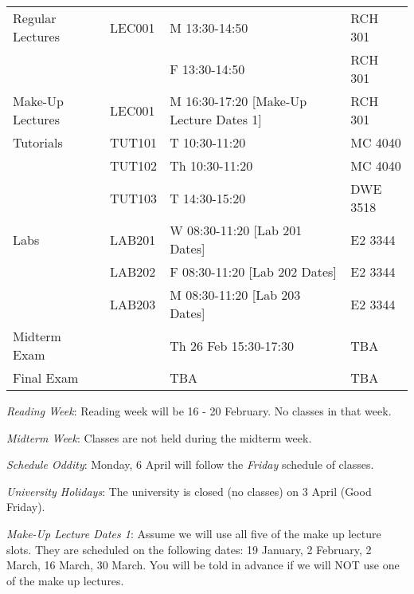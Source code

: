\documentclass[letterpaper,10pt]{article}
\begin{document}
\begin{table}[h]
        \begin{center}
        \begin{tabular}{l|l|l|l}


                 Regular Lectures & LEC001 & M 13:30-14:50 & RCH 301         \\
                                  &        & F 13:30-14:50 & RCH 301         \\
             \hline
                 Make-Up Lectures & LEC001 & M 16:30-17:20 [Make-Up Lecture Dates 1] & RCH 301         \\
                 \hline
                 Tutorials        & TUT101 & T   10:30-11:20 & MC 4040         \\
                                  & TUT102 & Th	 10:30-11:20 & MC 4040         \\
                                  & TUT103 & T   14:30-15:20 & DWE 3518        \\
                 \hline
                 Labs             & LAB201 & W 08:30-11:20 [Lab 201 Dates]          & E2 3344         \\
                                  & LAB202 & F 08:30-11:20 [Lab 202 Dates]          & E2 3344         \\
                                  & LAB203 & M 08:30-11:20 [Lab 203 Dates]          & E2 3344         \\
            \hline
            Midterm Exam          &        & Th 26 Feb 15:30-17:30 & TBA \\
            \hline
            Final Exam            &        & TBA                              & TBA       \\
          \end{tabular}
        \end{center}
\end{table}

\textit{Reading Week}: Reading week will be 16 - 20 February. No classes in that week.

\textit{Midterm Week}: Classes are not held during the midterm week.

\textit{Schedule Oddity}: Monday, 6 April will follow the \textit{Friday} schedule of classes.



\textit{University Holidays}: The university is closed (no classes) on 3 April (Good Friday).

\textit{Make-Up Lecture Dates 1}: Assume we will use all five of the make up lecture slots. They are scheduled on the following dates: 19 January, 2 February, 2 March, 16 March, 30 March. You will be told in advance if we will NOT use one of the make up lectures.
\end{document}
